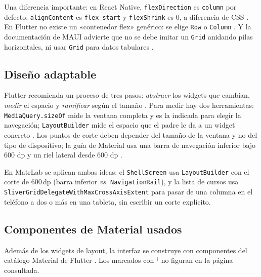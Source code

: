 Una diferencia importante: en React Native, \texttt{flexDirection} es \texttt{column} por defecto, \texttt{alignContent} es \texttt{flex-start} y \texttt{flexShrink} es 0, a diferencia de CSS \cite{rnflex}. En Flutter no existe un «contenedor flex» genérico: se elige \texttt{Row} o \texttt{Column} \cite{flutterrn}. Y la documentación de MAUI advierte que no se debe imitar un \texttt{Grid} anidando pilas horizontales, ni usar \texttt{Grid} para datos tabulares \cite{mauilayout}.

\subsection{Diseño adaptable}
\label{sec:adaptable}
Flutter recomienda un proceso de tres pasos: \emph{abstraer} los widgets que cambian, \emph{medir} el espacio y \emph{ramificar} según el tamaño \cite{flutteradapt}. Para medir hay dos herramientas: \texttt{MediaQuery.sizeOf} mide la ventana completa y es la indicada para elegir la navegación; \texttt{LayoutBuilder} mide el espacio que el padre le da a un widget concreto \cite{flutteradapt}. Los puntos de corte deben depender del tamaño de la ventana y no del tipo de dispositivo; la guía de Material usa una barra de navegación inferior bajo 600 dp y un riel lateral desde 600 dp \cite{flutteradapt}.

En MatrLab se aplican ambas ideas: el \texttt{ShellScreen} usa \texttt{LayoutBuilder} con el corte de 600\,dp (barra inferior \emph{vs.} \texttt{NavigationRail}), y la lista de cursos usa \texttt{SliverGridDelegateWithMaxCrossAxisExtent} para pasar de una columna en el teléfono a dos o más en una tableta, sin escribir un corte explícito.

\subsection{Componentes de Material usados}
\label{sec:material}
Además de los widgets de layout, la interfaz se construye con componentes del catálogo Material de Flutter \cite{fluttermaterial}. Los marcados con $^\dagger$ no figuran en la página consultada.

